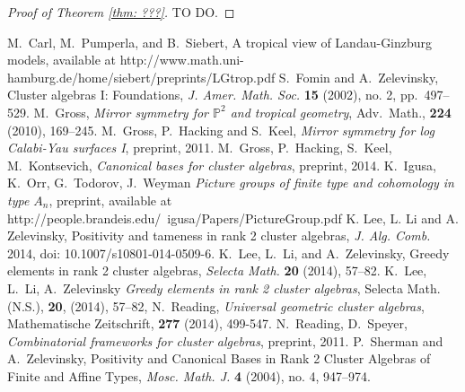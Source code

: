 \documentclass[11pt]{amsart}
\theoremstyle{remark}
\numberwithin{equation}{section}
\begin{document}
\begin{proof}[Proof of Theorem \ref{thm: ???}]
TO DO.
\end{proof}
\begin{thebibliography}{99}
  
   M.~Carl, M.~Pumperla, and B.~Siebert, A tropical view of Landau-Ginzburg models, available at http://www.math.uni-hamburg.de/home/siebert/preprints/LGtrop.pdf
   S.~Fomin and A.~Zelevinsky, Cluster algebras I: Foundations,  \textsl{J. Amer. Math. Soc.} \textbf{15} (2002), no. 2, pp.~497--529.
   M.~Gross,  \emph{Mirror symmetry for $\mathbb{P}^2$ and tropical geometry}, Adv.\ Math., {\bf 224} (2010), 169--245. 
   M.~Gross, P.~Hacking and S.~Keel, \emph{Mirror symmetry for log Calabi-Yau surfaces I}, preprint, 2011.
   M.~Gross, P.~Hacking, S.~Keel, M.~Kontsevich, \emph{Canonical bases for cluster algebras}, preprint, 2014.
   K.~Igusa, K.~Orr, G.~Todorov, J.~Weyman \emph{Picture groups of finite type and cohomology in type $A_n$}, preprint, available at http://people.brandeis.edu/~igusa/Papers/PictureGroup.pdf 
   K. Lee, L. Li and A. Zelevinsky, Positivity and tameness in rank 2 cluster algebras, \textsl{J. Alg. Comb.} 2014, doi: 10.1007/s10801-014-0509-6.
   K.~Lee, L.~Li, and A.~Zelevinsky, Greedy elements in rank 2 cluster algebras, \textsl{Selecta Math.} \textbf{20} (2014), 57--82.
   K.~Lee, L.~Li, A.~Zelevinsky \emph{Greedy elements in rank 2 cluster algebras}, Selecta Math. (N.S.), {\bf 20}, (2014), 57--82,
   N.~Reading, \emph{Universal geometric cluster algebras}, Mathematische Zeitschrift, {\bf 277 } (2014), 499-547.
   N.~Reading, D.~Speyer, \emph{Combinatorial frameworks for cluster algebras}, preprint, 2011.
   P.~Sherman and A.~Zelevinsky, Positivity and Canonical Bases in Rank 2 Cluster Algebras of Finite and Affine Types, \textsl{Mosc. Math. J.} \textbf{4} (2004), no. 4, 947--974.

\end{thebibliography}
\end{document}
